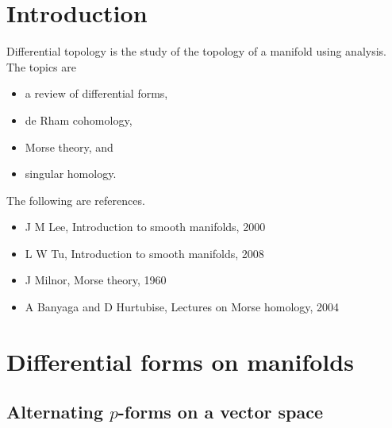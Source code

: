 \def\syllabus{Differential forms on manifolds. Integrations on manifolds. Stokes' theorem. De Rham cohomology. Homotopy invariance. The Mayer-Vietoris sequence. Compactly supported de Rham cohomology. Poincar\'e duality. Degree of a morphism. CW-complexes. The CW-structure associated to a Morse function. The fundamental theorems of Morse theory. Morse homology. Singular homology. Singular cohomology.}
\def\thm{section}



\newcommand{\da}{\partial}
\newcommand{\ext}{\textstyle\bigwedge}





\section{Introduction}


Differential topology is the study of the topology of a manifold using analysis. The topics are
\begin{itemize}
\item a review of differential forms,
\item de Rham cohomology,
\item Morse theory, and
\item singular homology.
\end{itemize}
The following are references.
\begin{itemize}
\item J M Lee, Introduction to smooth manifolds, 2000
\item L W Tu, Introduction to smooth manifolds, 2008
\item J Milnor, Morse theory, 1960
\item A Banyaga and D Hurtubise, Lectures on Morse homology, 2004
\end{itemize}

\pagebreak

\section{Differential forms on manifolds}

\subsection{Alternating \texorpdfstring{$ p $}{p}-forms on a vector space}

